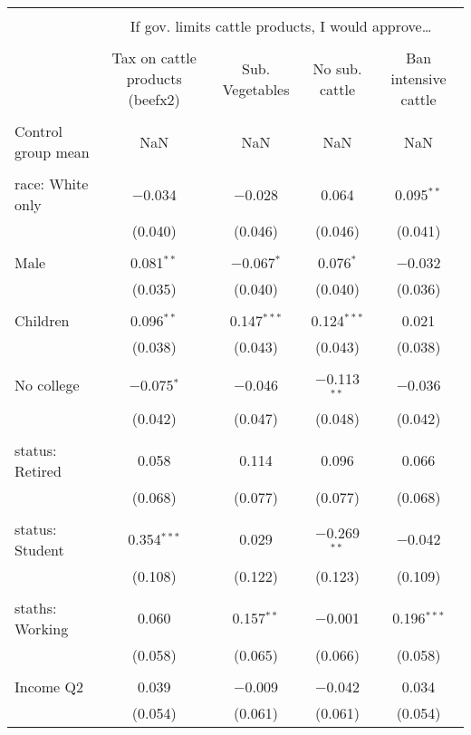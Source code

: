 
\begin{tabular}{@{\extracolsep{5pt}}lcccc} 
\\[-1.8ex]\hline 
\hline \\[-1.8ex] 
 & \multicolumn{4}{c}{If gov. limits cattle products, I would approve…} \\ 
\cline{2-5} 
\\[-1.8ex] & Tax on cattle products (beefx2) & Sub. Vegetables & No sub. cattle & Ban intensive cattle \\ 
\hline \\[-1.8ex] 
 Control group mean & NaN & NaN & NaN & NaN  \\ \hline \\[-1.8ex] race: White only & $-$0.034 & $-$0.028 & 0.064 & 0.095$^{**}$ \\ 
  & (0.040) & (0.046) & (0.046) & (0.041) \\ 
  & & & & \\ 
 Male & 0.081$^{**}$ & $-$0.067$^{*}$ & 0.076$^{*}$ & $-$0.032 \\ 
  & (0.035) & (0.040) & (0.040) & (0.036) \\ 
  & & & & \\ 
 Children & 0.096$^{**}$ & 0.147$^{***}$ & 0.124$^{***}$ & 0.021 \\ 
  & (0.038) & (0.043) & (0.043) & (0.038) \\ 
  & & & & \\ 
 No college & $-$0.075$^{*}$ & $-$0.046 & $-$0.113$^{**}$ & $-$0.036 \\ 
  & (0.042) & (0.047) & (0.048) & (0.042) \\ 
  & & & & \\ 
 status: Retired & 0.058 & 0.114 & 0.096 & 0.066 \\ 
  & (0.068) & (0.077) & (0.077) & (0.068) \\ 
  & & & & \\ 
 status: Student & 0.354$^{***}$ & 0.029 & $-$0.269$^{**}$ & $-$0.042 \\ 
  & (0.108) & (0.122) & (0.123) & (0.109) \\ 
  & & & & \\ 
 staths: Working & 0.060 & 0.157$^{**}$ & $-$0.001 & 0.196$^{***}$ \\ 
  & (0.058) & (0.065) & (0.066) & (0.058) \\ 
  & & & & \\ 
 Income Q2 & 0.039 & $-$0.009 & $-$0.042 & 0.034 \\ 
  & (0.054) & (0.061) & (0.061) & (0.054) \\ 

\end{tabular}
